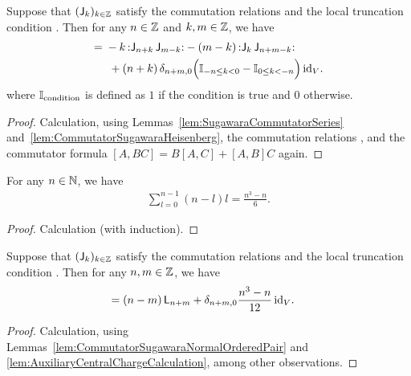 \begin{lemma}
  \label{lem:CommutatorSugawaraNormalOrderedPair}
  \leanok
  Suppose that $(\mathsf{J}_{k})_{k \in \mathbb{Z}}$ satisfy the commutation relations
  \tagHeiComm{} and the local truncation condition
  \tagHeiTrunc{}. Then for any $n \in \mathbb{Z}$ and $k, m \in \mathbb{Z}$, we have
  \begin{align*}
    [\Loper_n, \normalOrder{\Joper_k \, \Joper_{m-k}}]
    = \; &
    -k \, \normalOrder{\Joper_{n+k} \, \Joper_{m-k}}
    - (m-k) \, \normalOrder{\Joper_{k} \, \Joper_{n+m-k}} \\
      & \; + (n+k) \, \delta_{n+m,0}
        \Big( \indicator{-n \le k < 0} - \indicator{0 \le k < - n} \Big) \, \id_V .
  \end{align*}
  where $\mathbb{I}_{{\mathrm{condition}}}$ is defined as $1$ if the condition is true
  and $0$ otherwise.
\end{lemma}
\begin{proof}
  \leanok
  Calculation, using Lemmas~\ref{lem:SugawaraCommutatorSeries}
  and~\ref{lem:CommutatorSugawaraHeisenberg},
  the commutation relations \tagHeiComm{},
  and the commutator formula $[A,BC] = B[A,C] + [A,B]C$ again.
\end{proof}

\begin{lemma}
  \label{lem:AuxiliaryCentralChargeCalculation}
  \leanok
  For any $n \in \mathbb{N}$, we have
  \begin{align*}
    \sum_{l=0}^{n-1} (n-l) l = \frac{n^3 - n}{6} .
  \end{align*}
\end{lemma}
\begin{proof}
  \leanok
  Calculation (with induction).
\end{proof}

\begin{lemma}
  \label{lem:CommutatorSugawara}
  \leanok
  Suppose that $(\mathsf{J}_{k})_{k \in \mathbb{Z}}$ satisfy the commutation relations
  \tagHeiComm{} and the local truncation condition
  \tagHeiTrunc{}. Then for any $n, m \in \mathbb{Z}$, we have
  \begin{align*}
    [\Loper_n, \Loper_m]
    = \; &
    (n-m) \, \Loper_{n+m} + \delta_{n+m,0} \frac{n^3 - n}{12} \, \id_V .
  \end{align*}
\end{lemma}
\begin{proof}
  \leanok
  Calculation, using Lemmas~\ref{lem:CommutatorSugawaraNormalOrderedPair}
  and \ref{lem:AuxiliaryCentralChargeCalculation}, among other observations.
\end{proof}

